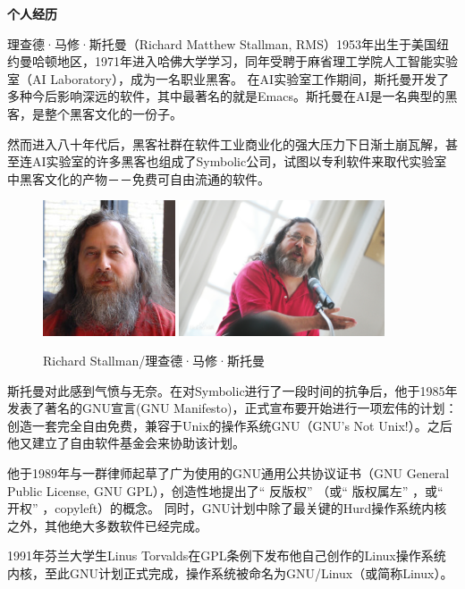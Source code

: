 \documentclass[doctor,openright,twoside]{sjtuthesis}
\theoremstyle{plain}
\theoremstyle{definition}
\theoremstyle{remark}
\theoremstyle{ocrenumbox}
\theoremstyle{plain}
\begin{document}
\textbf{个人经历}

理查德·马修·斯托曼（Richard Matthew Stallman, RMS）1953年出生于美国纽约曼哈顿地区，1971年进入哈佛大学学习，同年受聘于麻省理工学院人工智能实验室（AI Laboratory），成为一名职业黑客。 在AI实验室工作期间，斯托曼开发了多种今后影响深远的软件，其中最著名的就是Emacs。斯托曼在AI是一名典型的黑客，是整个黑客文化的一份子。

然而进入八十年代后，黑客社群在软件工业商业化的强大压力下日渐土崩瓦解，甚至连AI实验室的许多黑客也组成了Symbolic公司，试图以专利软件来取代实验室中黑客文化的产物－－免费可自由流通的软件。

\begin{figure}[!htp]
  \centering
  \includegraphics[height=4cm]{images/richardstallman.jpg}
  \hspace{1cm}
  \includegraphics[height=4cm]{images/richardstallman.png}
  \label{fig:rms}
  \caption{Richard Stallman/理查德·马修·斯托曼}
\end{figure}

斯托曼对此感到气愤与无奈。在对Symbolic进行了一段时间的抗争后，他于1985年发表了著名的GNU宣言(GNU Manifesto)，正式宣布要开始进行一项宏伟的计划：创造一套完全自由免费，兼容于Unix的操作系统GNU（GNU's Not Unix!）。之后他又建立了自由软件基金会来协助该计划。

他于1989年与一群律师起草了广为使用的GNU通用公共协议证书（GNU General Public License, GNU GPL），创造性地提出了`` 反版权'' （或`` 版权属左'' ，或`` 开权'' ，copyleft）的概念。 同时，GNU计划中除了最关键的Hurd操作系统内核之外，其他绝大多数软件已经完成。

1991年芬兰大学生Linus Torvalds在GPL条例下发布他自己创作的Linux操作系统内核，至此GNU计划正式完成，操作系统被命名为GNU/Linux（或简称Linux）。
\end{document}
